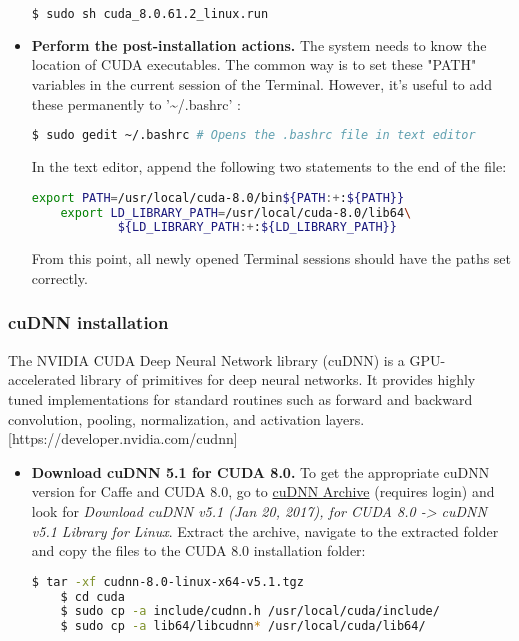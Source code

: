 \begin{itemize}
	\begin{lstlisting}[language=bash]
	$ sudo sh cuda_8.0.61.2_linux.run
	\end{lstlisting}
	
	\item \textbf{Perform the post-installation actions.} The system needs to know the location of CUDA executables. The common way is to set these "PATH" variables in the current session of the Terminal. However, it's useful to add these permanently to '\textasciitilde{}/.bashrc' :
		
	\begin{lstlisting}[language=bash]
	$ sudo gedit ~/.bashrc # Opens the .bashrc file in text editor
	\end{lstlisting}
	
	In the text editor, append the following two statements to the end of the file:
	
	\begin{lstlisting}[language=bash]
	export PATH=/usr/local/cuda-8.0/bin${PATH:+:${PATH}}
	export LD_LIBRARY_PATH=/usr/local/cuda-8.0/lib64\
			${LD_LIBRARY_PATH:+:${LD_LIBRARY_PATH}}
	\end{lstlisting}	
	
	From this point, all newly opened Terminal sessions should have the paths set correctly. 
	
\end{itemize}

\subsubsection{cuDNN installation}

The NVIDIA CUDA Deep Neural Network library (cuDNN) is a GPU-accelerated library of primitives for deep neural networks. It provides highly tuned implementations for standard routines such as forward and backward convolution, pooling, normalization, and activation layers. [https://developer.nvidia.com/cudnn] 

\begin{itemize}
	\item \textbf{Download cuDNN 5.1 for CUDA 8.0.} To get the appropriate cuDNN version for Caffe and CUDA 8.0, go to \href{https://developer.nvidia.com/rdp/cudnn-archive}{cuDNN Archive} (requires login) and look for \textit{Download cuDNN v5.1 (Jan 20, 2017), for CUDA 8.0 -> cuDNN v5.1 Library for Linux}. Extract the archive, navigate to the extracted folder and copy the files to the CUDA 8.0 installation folder:
	
	\begin{lstlisting}[language=bash]
	$ tar -xf cudnn-8.0-linux-x64-v5.1.tgz 
	$ cd cuda
	$ sudo cp -a include/cudnn.h /usr/local/cuda/include/
	$ sudo cp -a lib64/libcudnn* /usr/local/cuda/lib64/
	\end{lstlisting}	
\end{itemize}

